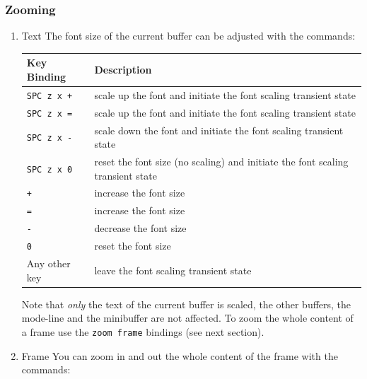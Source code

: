 \documentclass[11pt]{article}
\begin{document}
\subsubsection{Zooming}
\label{sec:org8c8e114}
\begin{enumerate}
\item Text
\label{sec:orgae9b8c9}
The font size of the current buffer can be adjusted with the commands:

\begin{center}
\begin{tabular}{ll}
Key Binding & Description\\
\hline
\texttt{SPC z x +} & scale up the font and initiate the font scaling transient state\\
\texttt{SPC z x =} & scale up the font and initiate the font scaling transient state\\
\texttt{SPC z x -} & scale down the font and initiate the font scaling transient state\\
\texttt{SPC z x 0} & reset the font size (no scaling) and initiate the font scaling transient state\\
\texttt{+} & increase the font size\\
\texttt{=} & increase the font size\\
\texttt{-} & decrease the font size\\
\texttt{0} & reset the font size\\
Any other key & leave the font scaling transient state\\
\end{tabular}
\end{center}

Note that \emph{only} the text of the current buffer is scaled, the other buffers,
the mode-line and the minibuffer are not affected. To zoom the whole content of
a frame use the \texttt{zoom frame} bindings (see next section).

\item Frame
\label{sec:org86b9b3b}
You can zoom in and out the whole content of the frame with the commands:


\end{enumerate}
\end{document}
